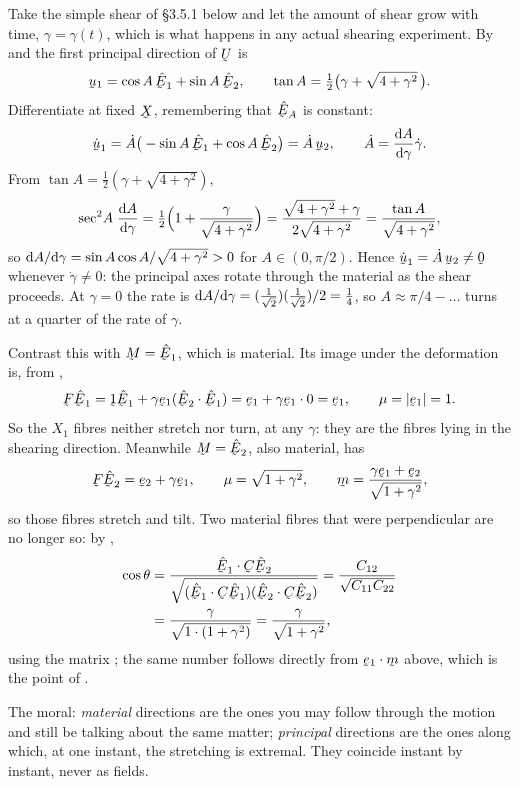 \begin{remark}
\label{rem:notmaterial}
Take the simple shear of \S3.5.1 below and let the amount of shear grow
with time, $\gamma=\gamma(t)$, which is what happens in any actual shearing
experiment. By  and  the first principal direction of
$\bU$ is
\[
   \bu_{1}=\cos A\,\hbE_{1}+\sin A\,\hbE_{2},
   \qquad
   \tan A=\tfrac12\big(\gamma+\sqrt{4+\gamma^{2}}\,\big).
\]
Differentiate at fixed $\bX$, remembering that $\hbE_{A}$ is constant:
\[
   \dot\bu_{1}=\dot A\big(-\sin A\,\hbE_{1}+\cos A\,\hbE_{2}\big)
             =\dot A\,\bu_{2},
   \qquad
   \dot A=\frac{\dl A}{\dl\gamma}\dot\gamma .
\]
From $\tan A=\tfrac12(\gamma+\sqrt{4+\gamma^{2}})$,
\[
   \sec^{2}\!A\;\frac{\mathrm{d} A}{\mathrm{d}\gamma}
   =\tfrac12\Big(1+\frac{\gamma}{\sqrt{4+\gamma^{2}}}\Big)
   =\frac{\sqrt{4+\gamma^{2}}+\gamma}{2\sqrt{4+\gamma^{2}}}
   =\frac{\tan A}{\sqrt{4+\gamma^{2}}},
\]
so $\mathrm{d} A/\mathrm{d}\gamma=\sin A\cos A/\sqrt{4+\gamma^{2}}>0$ for
$A\in(0,\pi/2)$. Hence $\dot\bu_{1}=\dot A\,\bu_{2}\neq\bze$ whenever
$\dot\gamma\neq0$: the principal axes rotate through the material as the
shear proceeds. At $\gamma=0$ the rate is $\mathrm{d} A/\mathrm{d}\gamma=
(\tfrac{1}{\sqrt2})(\tfrac1{\sqrt2})/2=\tfrac14$, so
$A\approx\pi/4-\ldots$ turns at a quarter of the rate of $\gamma$.

Contrast this with $\bM=\hbE_{1}$, which is material. Its image under the
deformation is, from ,
\[
   \bF\hbE_{1}=\shift\hbE_{1}+\gamma\be_{1}(\ip{\hbE_{2}}{\hbE_{1}})
             =\be_{1}+\gamma\be_{1}\cdot0=\be_{1},
   \qquad \mu=|\be_{1}|=1 .
\]
So the $X_{1}$ fibres neither stretch nor turn, at any $\gamma$: they are
the fibres lying in the shearing direction. Meanwhile $\bM=\hbE_{2}$, also
material, has
\[
   \bF\hbE_{2}=\be_{2}+\gamma\be_{1},\qquad
   \mu=\sqrt{1+\gamma^{2}},\qquad
   \bm=\frac{\gamma\be_{1}+\be_{2}}{\sqrt{1+\gamma^{2}}},
\]
so those fibres stretch and tilt. Two material fibres that were
perpendicular are no longer so: by ,
\[
\begin{aligned}
   \cos\theta&=\frac{\ip{\hbE_{1}}{\bC\hbE_{2}}}
   {\sqrt{(\ip{\hbE_{1}}{\bC\hbE_{1}})(\ip{\hbE_{2}}{\bC\hbE_{2}})}}
   =\frac{C_{12}}{\sqrt{C_{11}C_{22}}}\\
   &=\frac{\gamma}{\sqrt{1\cdot(1+\gamma^{2})}}
   =\frac{\gamma}{\sqrt{1+\gamma^{2}}},
\end{aligned}
\]
using the matrix ; the same number follows directly from
$\ip{\be_{1}}{\bm}$ above, which is the point of .

The moral: \emph{material} directions are the ones you may follow through
the motion and still be talking about the same matter; \emph{principal}
directions are the ones along which, at one instant, the stretching is
extremal. They coincide instant by instant, never as fields.
\end{remark}

